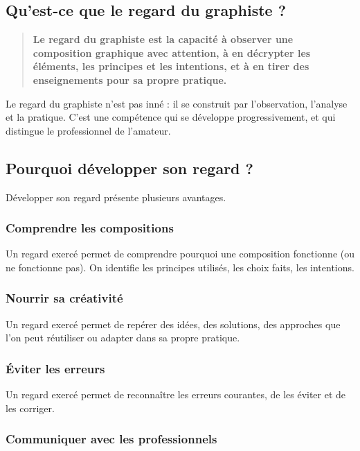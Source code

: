 \subsection{Qu'est-ce que le regard du graphiste ?}

\begin{quote}
\textbf{Le regard du graphiste est la capacité à observer une composition graphique avec attention, à en décrypter les éléments, les principes et les intentions, et à en tirer des enseignements pour sa propre pratique.}
\end{quote}

Le regard du graphiste n'est pas inné : il se construit par l'observation, l'analyse et la pratique. C'est une compétence qui se développe progressivement, et qui distingue le professionnel de l'amateur.

\subsection{Pourquoi développer son regard ?}

Développer son regard présente plusieurs avantages.

\subsubsection{Comprendre les compositions}

Un regard exercé permet de comprendre pourquoi une composition fonctionne (ou ne fonctionne pas). On identifie les principes utilisés, les choix faits, les intentions.

\subsubsection{Nourrir sa créativité}

Un regard exercé permet de repérer des idées, des solutions, des approches que l'on peut réutiliser ou adapter dans sa propre pratique.

\subsubsection{Éviter les erreurs}

Un regard exercé permet de reconnaître les erreurs courantes, de les éviter et de les corriger.

\subsubsection{Communiquer avec les professionnels}

